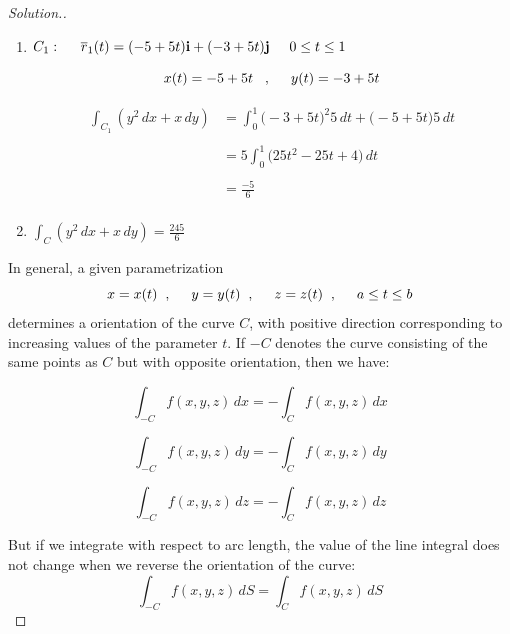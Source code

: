\documentclass[11pt,a4paper]{article}
\theoremstyle{definition}
\newenvironment{solution}
  {\renewcommand{\qedsymbol}{}\begin{proof}[\textit{Solution}.]}
  {\end{proof}}
\begin{document}
\begin{solution}
\begin{enumerate}
\item $C_1: \hspace{0.5cm} \overline{r}_1(t) = (-5 + 5t)\textbf{i} + (-3 + 5t) \textbf{j}\hspace{0.5cm} 0\leq t \leq 1$

$$x(t) = -5 + 5t\hspace{0.3cm} , \hspace{0.5cm} y(t) = -3 + 5t$$

\begin{align*}
\int_{C_1}( y^2\,dx + x\,dy )& = \int^1_0 \big(-3 + 5t\big)^2 5\,dt + \big(-5 + 5t\big)5\, dt\\\\
& = 5 \int^1_0 \big(25t^2 - 25t + 4\big) \,dt\\\\
& = \frac{-5}{6}\\
\end{align*}

\item $\displaystyle{\int_C (y^2\,dx + x\,dy) = \frac{245}{6}}$
\end{enumerate}

In general, a given parametrization $$x = x(t)\hspace{0.2cm}, \hspace{0.5cm} y = y(t)\hspace{0.2cm} ,\hspace{0.5cm} z = z(t)\hspace{0.2cm} ,\hspace{0.5cm} a\leq t \leq b$$ determines a orientation of the curve $C$, with positive direction corresponding to increasing values of the parameter $t$. If $-C$ denotes the curve consisting of the same points as $C$ but with opposite orientation, then we have:

$$\int_{-C} f(x,y,z)\,dx = -\int_C f(x,y,z)\,dx$$

$$\int_{-C} f(x,y,z)\,dy = -\int_C f(x,y,z)\,dy$$

$$\int_{-C} f(x,y,z)\,dz = -\int_C f(x,y,z)\,dz$$

But if we integrate with respect to arc length, the value of the line integral does not change when we reverse the orientation of the curve:
$$\int_{-C}f(x,y,z)\,dS = \int_C f(x,y,z)\,dS$$
\end{solution}
\end{document}
